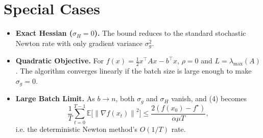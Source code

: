 \documentclass{article}
\newcommand{\E}{\mathbb{E}}
\newcommand{\norm}[1]{\left\|#1\right\|}
\begin{document}
\section*{Special Cases}
\begin{itemize}
\item \textbf{Exact Hessian ($\sigma_H=0$).} The bound reduces to the standard stochastic Newton rate with only gradient variance $\sigma_g^{2}$.
\item \textbf{Quadratic Objective.} For $f(x)=\frac12 x^{\top}Ax-b^{\top}x$, $\rho=0$ and $L=\lambda_{\max}(A)$. The algorithm converges linearly if the batch size is large enough to make $\sigma_g=0$.
\item \textbf{Large Batch Limit.} As $b\to n$, both $\sigma_g$ and $\sigma_H$ vanish, and (4) becomes
\[
\frac{1}{T}\sum_{t=0}^{T-1}\E\!\bigl[\norm{\nabla f(x_t)}^{2}\bigr]
\le \frac{2(f(x_0)-f^\star)}{\alpha\mu T},
\]
i.e. the deterministic Newton method’s $O(1/T)$ rate.
\end{itemize}
\end{document}
